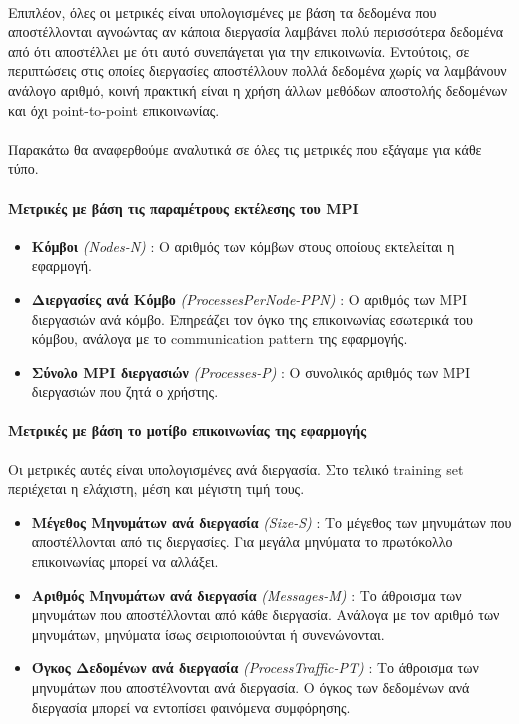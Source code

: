\paragraph{}
Επιπλέον, όλες οι μετρικές είναι υπολογισμένες με βάση τα δεδομένα που αποστέλλονται αγνοώντας αν κάποια διεργασία λαμβάνει πολύ περισσότερα δεδομένα από ότι αποστέλλει με ότι αυτό συνεπάγεται για την επικοινωνία. Εντούτοις, σε περιπτώσεις στις οποίες διεργασίες αποστέλλουν πολλά δεδομένα χωρίς να λαμβάνουν ανάλογο αριθμό, κοινή πρακτική είναι η χρήση άλλων μεθόδων αποστολής δεδομένων και όχι point-to-point επικοινωνίας.  

\paragraph{}
Παρακάτω θα αναφερθούμε αναλυτικά σε όλες τις μετρικές που εξάγαμε για κάθε τύπο.
\paragraph{Μετρικές με βάση τις παραμέτρους εκτέλεσης του MPI}
\begin{itemize}
\item \textbf{Κόμβοι} \textit{(Νodes-N)} : Ο αριθμός των κόμβων στους οποίους εκτελείται η εφαρμογή. 
\item \textbf{Διεργασίες ανά Κόμβο} \textit{(ProcessesPerNode-PPN)} : Ο αριθμός των MPI διεργασιών ανά κόμβο. Επηρεάζει τον όγκο της επικοινωνίας εσωτερικά του κόμβου, ανάλογα με το communication pattern της εφαρμογής.
\item \textbf{Σύνολο MPI διεργασιών} \textit{(Processes-P)} : Ο συνολικός αριθμός των MPI διεργασιών που ζητά ο χρήστης.
\end{itemize}

\paragraph{Μετρικές με βάση το μοτίβο επικοινωνίας της εφαρμογής\\} 
Οι μετρικές αυτές είναι υπολογισμένες ανά διεργασία. Στο τελικό training set περιέχεται η ελάχιστη, μέση και μέγιστη τιμή τους. 
\begin{itemize}
\item \textbf{Μέγεθος Μηνυμάτων ανά διεργασία} \textit{(Size-S)} :  Το μέγεθος των μηνυμάτων που αποστέλλονται από τις διεργασίες. Για μεγάλα μηνύματα το πρωτόκολλο επικοινωνίας μπορεί να αλλάξει.
\item \textbf{Αριθμός Μηνυμάτων ανά διεργασία} \textit{(Messages-M)} : Το άθροισμα των μηνυμάτων που αποστέλλονται από κάθε διεργασία. Ανάλογα με τον αριθμό των μηνυμάτων, μηνύματα ίσως σειριοποιούνται ή  συνενώνονται. 
\item \textbf{Όγκος Δεδομένων ανά διεργασία} \textit{ (ProcessTraffic-PT) } : Το άθροισμα των μηνυμάτων που αποστέλνονται ανά διεργασία. Ο όγκος των δεδομένων ανά διεργασία μπορεί να εντοπίσει φαινόμενα συμφόρησης. 
\end{itemize}

